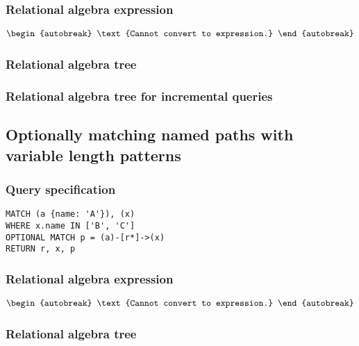 \subsubsection*{Relational algebra expression}

\begin{align*}
\begin{autobreak}
\text{Cannot convert to expression.}
\end{autobreak}
\end{align*}

\subsubsection*{Relational algebra tree}


\subsubsection*{Relational algebra tree for incremental queries}


\subsection{Optionally matching named paths with variable length patterns}

\subsubsection*{Query specification}

\begin{lstlisting}
MATCH (a {name: 'A'}), (x)
WHERE x.name IN ['B', 'C']
OPTIONAL MATCH p = (a)-[r*]->(x)
RETURN r, x, p
\end{lstlisting}

\subsubsection*{Relational algebra expression}

\begin{align*}
\begin{autobreak}
\text{Cannot convert to expression.}
\end{autobreak}
\end{align*}

\subsubsection*{Relational algebra tree}

